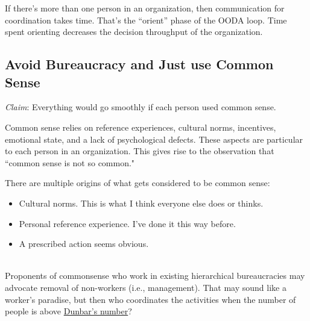 

If there's more than one person in an organization, then communication for coordination takes time. That's the ``orient'' phase of the OODA loop. Time spent orienting decreases the decision throughput of the organization.



\subsection*{Avoid Bureaucracy and Just use Common Sense}
\textit{Claim}: Everything would go smoothly if each person used common sense.

Common sense relies on reference experiences, cultural norms, incentives, emotional state, and a lack of psychological defects. These aspects are particular to each person in an organization. This gives rise to the observation that 
``common sense is not so common." 

There are multiple origins of what gets considered to be common sense:
\begin{itemize}
\item Cultural norms. This is what I think everyone else does or thinks.
\item Personal \gls{reference experience}.
I've done it this way before.
\item A prescribed action seems obvious.
\end{itemize}

\ \\

Proponents of commonsense who work in existing hierarchical bureaucracies may advocate removal of non-workers (i.e., management). That may sound like a worker's paradise, but then who coordinates the activities when the number of people is above 
\href{https://en.wikipedia.org/wiki/Dunbar\%27s_number}{Dunbar's number}?

